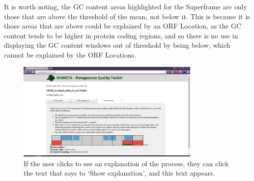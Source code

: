 It is worth noting, the GC content areas highlighted for the Superframe are only those that are above the threshold of the mean, not below it. This is because it is those areas that are above could be explained by an ORF Location, as the GC content tends to be higher in protein coding regions, and so there is no use in displaying the GC content windows out of threshold by being below, which cannot be explained by the ORF Locations.

\begin{figure}[H]
	\centering
\includegraphics[width=0.8\textwidth]{images/ui9}
\caption{If the user clicks to see an explanation of the process, they can click the text that says to `Show explanation', and this text appears.}
\end{figure}

